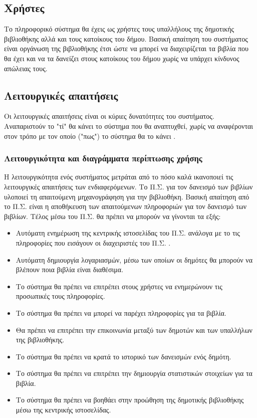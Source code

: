 \documentclass{assignment}
\begin{document}
\subsection{Χρήστες}

Το πληροφορικό σύστημα θα έχεις ως χρήστες τους υπαλλήλους της δημοτικής βιβλιοθήκης αλλά και τους κατοίκους του δήμου. Βασική απαίτηση του συστήματος είναι οργάνωση της βιβλιοθήκης έτσι ώστε να μπορεί να διαχειρίζεται τα βιβλία που θα έχει και να τα δανείζει στους κατοίκους του δήμου χωρίς να υπάρχει κίνδυνος απώλειας τους.

\subsection{Λειτουργικές απαιτήσεις}

Οι λειτουργικές απαιτήσεις είναι οι κύριες δυνατότητες του συστήματος. Αναπαριστούν το "τί" θα κάνει το σύστημα που θα αναπτυχθεί, χωρίς να αναφέρονται στον τρόπο με τον οποίο ("πως") το σύστημα θα το κάνει \cite{triadis}.

\subsubsection{Λειτουργικότητα και διαγράμματα περίπτωσης χρήσης}
\label{subsubsection: business_use_case}

Η λειτουργικότητα ενός συστήματος μετράται από το πόσο καλά ικανοποιεί τις λειτουργικές απαιτήσεις των ενδιαφερόμενων. Το Π.Σ. για τον δανεισμό των βιβλίων υλοποιεί τη απαιτούμενη μηχανογράφηση για την βιβλιοθήκη. Βασική απαίτηση από το Π.Σ. είναι η αποθήκευση των απαιτούμενων πληροφοριών για τον δανεισμό των βιβλίων. Τέλος μέσω του Π.Σ. θα πρέπει να μπορούν να γίνονται τα εξής:

\begin{itemize}
\item Αυτόματη ενημέρωση της κεντρικής ιστοσελίδας του Π.Σ. ανάλογα με το τις πληροφορίες που εισάγουν οι διαχειριστές του Π.Σ. .
\item Αυτόματη δημιουργία λογαριασμών, μέσω των οποίων οι δημότες θα μπορούν να βλέπουν ποια βιβλία είναι διαθέσιμα.
\item Το σύστημα θα πρέπει να επιτρέπει στους χρήστες να ενημερώνουν τις προσωπικές τους πληροφορίες.
\item Το σύστημα θα πρέπει να μπορεί να παρέχει πληροφορίες για τα βιβλία.
\item Θα πρέπει να επιτρέπει την επικοινωνία μεταξύ των δημοτών και των υπαλλήλων της βιβλιοθήκης. 
\item Το σύστημα θα πρέπει να κρατά το ιστορικό των δανεισμών ενός δημότη.
\item Το σύστημα θα πρέπει να επιτρέπει την δημιουργία στατιστικών στοιχείων για τα βιβλία.
\item Το σύστημα θα πρέπει να βοηθάει στην προώθηση της δημοτικής βιβλιοθήκης μέσω της κεντρικής ιστοσελίδας.
\end{itemize}
\end{document}
